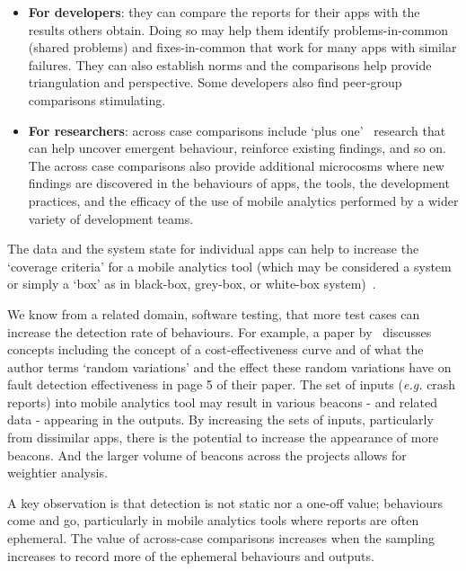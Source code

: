 \begin{itemize}
    \item \textbf{For developers}: they can compare the reports for their apps with the results others obtain. Doing so may help them identify problems-in-common (shared problems) and fixes-in-common that work for many apps with similar failures. They can also establish norms and the comparisons help provide triangulation and perspective. Some developers also find peer-group comparisons stimulating.
    
    \item \textbf{For researchers}: across case comparisons include `plus one'~\citep[pp 28-29]{aurini2016_how_to_of_qualitative_research} research that can help uncover emergent behaviour, reinforce existing findings, and so on. The across case comparisons also provide additional microcosms where new findings are discovered in the behaviours of apps, the tools, the development practices, and the efficacy of the use of mobile analytics performed by a wider variety of development teams.
\end{itemize}


The data and the system state for individual apps can help to increase the `coverage criteria' for a mobile analytics tool (which may be considered a system or simply a `box' as in black-box, grey-box, or white-box system)~. 

We know from a related domain, software testing, that more test cases can increase the detection rate of behaviours. For example, a paper by~\citet{briand2007_a_critical_analysis_of_empirical_research_in_software_testing} discusses concepts including the concept of a cost-effectiveness curve and of what the author terms `random variations' and the effect these random variations have on fault detection effectiveness in page 5 of their paper. The set of inputs (\textit{e.g.} crash reports) into mobile analytics tool may result in various beacons - and related data - appearing in the outputs. By increasing the sets of inputs, particularly from dissimilar apps, there is the potential to increase the appearance of more beacons. And the larger volume of beacons across the projects allows for weightier analysis.

A key observation is that detection is not static nor a one-off value; behaviours come and go, particularly in mobile analytics tools where reports are often ephemeral. The value of across-case comparisons increases when the sampling increases to record more of the ephemeral behaviours and outputs.

